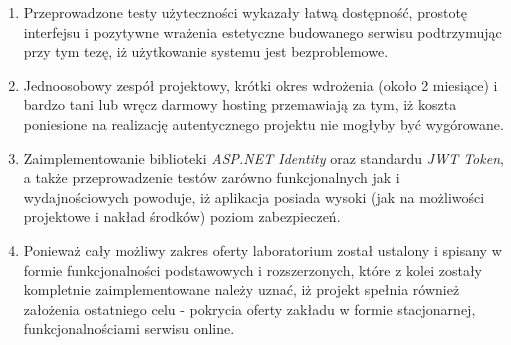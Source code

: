 \begin{enumerate}
    \item Przeprowadzone testy użyteczności wykazały łatwą dostępność, prostotę interfejsu i pozytywne wrażenia estetyczne budowanego serwisu podtrzymując przy tym tezę, iż użytkowanie systemu jest bezproblemowe.
    \item Jednoosobowy zespół projektowy, krótki okres wdrożenia (około 2 miesiące) i bardzo tani lub wręcz darmowy hosting przemawiają za tym, iż koszta poniesione na realizację autentycznego projektu nie mogłyby być wygórowane.
    \item Zaimplementowanie biblioteki \textit{ASP.NET Identity} oraz standardu \textit{JWT Token}, a także przeprowadzenie testów zarówno funkcjonalnych jak i wydajnościowych powoduje, iż aplikacja posiada wysoki (jak na możliwości projektowe i nakład środków) poziom zabezpieczeń.
    \item Ponieważ cały możliwy zakres oferty laboratorium został ustalony i spisany w formie funkcjonalności podstawowych i rozszerzonych, które z kolei zostały kompletnie zaimplementowane należy uznać, iż projekt spełnia również założenia ostatniego celu - pokrycia oferty zakładu w formie stacjonarnej, funkcjonalnościami serwisu online.
\end{enumerate}

